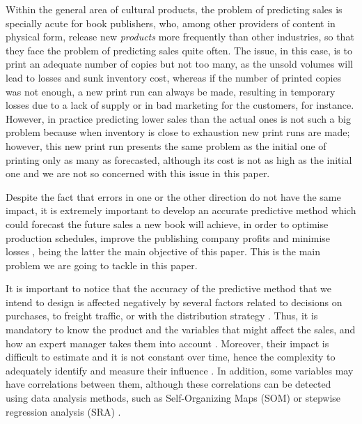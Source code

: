 \documentclass[a4paper,10pt,twocolumn,preprint,3p]{elsarticle}
\begin{document}
Within the general area of cultural products, the problem of
predicting sales is specially acute for book publishers, who, among other
providers of content in physical form, release new {\em products} more frequently than
other industries, so that they face the problem of predicting sales quite often. The issue, in this case, is to print an adequate number of copies but not too many, as the unsold volumes will lead to losses and sunk inventory cost, 
whereas if the number of printed copies was not enough, a new print
run can always be made, resulting in temporary losses due to a lack of supply
or in bad marketing for the customers, for instance. However, in
practice predicting lower sales than the actual ones is not such a big
problem because when inventory is close to exhaustion new print runs
are made; however, this new print run presents the same problem as the
initial one of printing only as many as forecasted, although its cost
is not as high as the initial one and we are not so concerned with
this issue in this paper.

Despite the fact that errors in one or the other direction do not have
the same impact, it is extremely important to develop an accurate
predictive method 
which could forecast the future sales a new book will achieve, in
order to optimise production schedules, improve the publishing company
profits and minimise losses \cite{Zhao2001}, being the latter the main
objective of this paper.  This is the main problem we are going to
tackle in this paper.

It is important to notice that the accuracy of the predictive method
that we intend to design is affected negatively by several factors
related to decisions on purchases, to freight traffic, or with the
distribution strategy \cite{Little1998}. 
Thus, it is mandatory to know the product and the variables that
might affect the sales, and how an expert manager takes them into 
account \cite{Armstrong2001,SThomassey2014}. 
Moreover, their impact is difficult to estimate and it is not constant over time, hence the complexity to adequately identify and measure their influence \cite{DeToni2000}.
In addition, some variables may have correlations between them, although these correlations can be detected using data analysis methods, 
such as Self-Organizing Maps (SOM) \cite{kohonen1998} or stepwise regression analysis (SRA) \cite{Chang2009}. 
\end{document}

